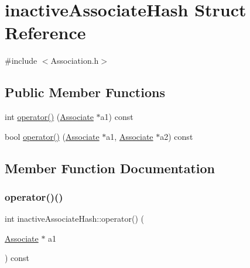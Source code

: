 \hypertarget{structinactiveAssociateHash}{}\section{inactive\+Associate\+Hash Struct Reference}
\label{structinactiveAssociateHash}


{\ttfamily \#include $<$Association.\+h$>$}

\subsection*{Public Member Functions}
\begin{DoxyCompactItemize}
\item 
int \mbox{\hyperlink{structinactiveAssociateHash_aa046ff4957076a709207e09002e2c19a}{operator()}} (\mbox{\hyperlink{classAssociate}{Associate}} $\ast$a1) const
\item 
bool \mbox{\hyperlink{structinactiveAssociateHash_a04f0e1fe0e51c42cfe7ebe4f3e280c03}{operator()}} (\mbox{\hyperlink{classAssociate}{Associate}} $\ast$a1, \mbox{\hyperlink{classAssociate}{Associate}} $\ast$a2) const
\end{DoxyCompactItemize}


\subsection{Member Function Documentation}
\mbox{\label{structinactiveAssociateHash_aa046ff4957076a709207e09002e2c19a}} 
\subsubsection{\texorpdfstring{operator()()}{operator()()}\hspace{0.1cm}{\footnotesize\ttfamily [1/2]}}
{\footnotesize\ttfamily int inactive\+Associate\+Hash\+::operator() (\begin{DoxyParamCaption}\item[{\mbox{\hyperlink{classAssociate}{Associate}} $\ast$}]{a1 }\end{DoxyParamCaption}) const\hspace{0.3cm}{\ttfamily [inline]}}

\mbox{\label{structinactiveAssociateHash_a04f0e1fe0e51c42cfe7ebe4f3e280c03}} 
